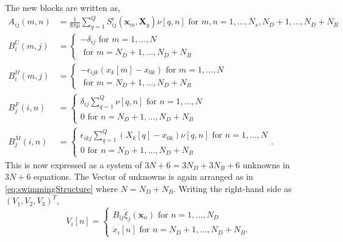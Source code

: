 The new blocks are written as,
\begin{align*}
A_{ij}(m,n) &= \frac{1}{8\pi\mu} \sum_{q=1}^Q S_{ij}^\epsilon (\bm{x}_m,\bm{X}_{q})\nu[q,n] \text { for } m,n = 1,\dots,N_s,N_D+1,\dots,N_D+N_B  \\
B_{i}^{U}(m,j) &= \begin{cases} -\delta_{ij} \text { for } m = 1,\dots,N \\ \text { for } m = N_D+1,\dots,N_D+N_B\end{cases}\\
B_{i}^{\Omega}(m,j) &= \begin{cases} -\epsilon_{ijk}(x_k[m]-x_{0k}) \text { for } m = 1,\dots,N \\ \text { for } m = N_D+1,\dots,N_D+N_B\end{cases}\\
B_{j}^{F}(i,n) &= \begin{cases} \delta_{ij} \sum_{q=1}^Q \nu[q,n] \text { for } n = 1,\dots,N \\ 0 \text { for } n = N_D+1,\dots,N_D+N_B\end{cases} \\
B_{j}^{M}(i,n) &= \begin{cases} \epsilon_{ikj} \sum_{q=1}^Q (X_k[q]-x_{0 k}) \nu[q,n] \text { for } n = 1,\dots,N \\ 0 \text { for } n = N_D+1,\dots,N_D+N_B\end{cases}.
\end{align*}
This is now expressed as a system of $3N + 6 = 3N_D+3N_B + 6$ unknowns in $3N+6$ equations. The Vector of unknowns is again arranged as in \cref{eq:swimmingStructure} where $N=N_D+N_B$. Writing the right-hand side as $(V_1,V_2,V_3)^T$,
\begin{equation*}
    V_i[n] = \begin{cases} B_{i j} \dot{\xi}_{j}({\bm{x}}_{n}) \text{ for } n=1,\dots,N_D \\ \dot{x}_i[n] \text{ for } n=N_D+1,\dots,N_D+N_B. \end{cases}
\end{equation*}

